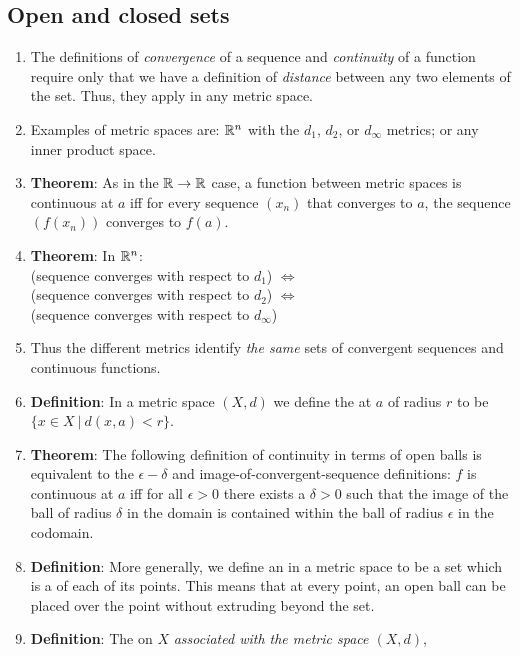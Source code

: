 \subsection{Open and closed sets}
\begin{enumerate}
\item The definitions of {\it convergence} of a sequence and {\it continuity} of a function require
  only that we have a definition of {\it distance} between any two elements of the set. Thus, they
  apply in any metric space.
\item Examples of metric spaces are: $\mathbb{R}^n$ with the $d_1$, $d_2$, or $d_\infty$ metrics; or any
  inner product space.
\item {\bf Theorem}: As in the $\mathbb{R} \to \mathbb{R}$ case, a function between metric spaces is continuous at
  $a$ iff for every sequence $(x_n)$ that converges to $a$, the sequence $(f(x_n))$ converges to
  $f(a)$.
\item {\bf Theorem}: In $\mathbb{R}^n$:\\
  (sequence converges with respect to $d_1$) $\iff$\\
  (sequence converges with respect to $d_2$) $\iff$\\
  (sequence converges with respect to $d_\infty$)
\item Thus the different metrics identify {\it the same} sets of convergent sequences and
  continuous functions.
\item {\bf Definition}: In a metric space $(X, d)$ we define the  at $a$ of radius
  $r$ to be $\{x \in X ~|~ d(x, a) < r\}$.
\item {\bf Theorem}: The following definition of continuity in terms of open balls is equivalent to
  the $\epsilon-\delta$ and image-of-convergent-sequence definitions: $f$ is continuous at $a$ iff
  for all $\epsilon > 0$ there exists a $\delta > 0$ such that the image of the ball of radius
  $\delta$ in the domain is contained within the ball of radius $\epsilon$ in the codomain.
\item {\bf Definition}: More generally, we define an  in a metric space to be a set
  which is a  of each of its points. This means that at every point, an open
  ball can be placed over the point without extruding beyond the set.
\item {\bf Definition}: The  on $X$ {\it associated with the metric space $(X, d)$},

\end{enumerate}
